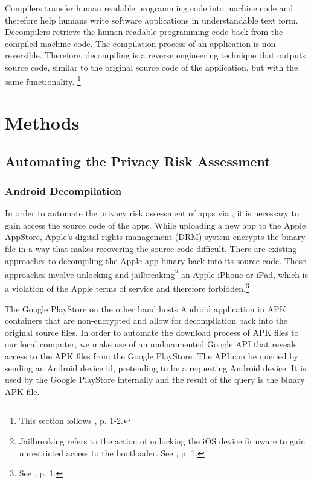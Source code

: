\documentclass[
	a4paper,
	oneside,
	12pt,
	liststotocnumbered
]{article}
\let\cite\textcite
\begin{document}
Compilers transfer human readable programming code into machine code and therefore help humans write software applications in understandable text form. 
Decompilers retrieve the human readable programming code back from the compiled machine code. 
The compilation process of an application is non-reversible. Therefore, decompiling is a reverse engineering technique that outputs source code, similar to the original source code of the application, but with the same functionality.  
\footnote{This section follows \cite{nolan2012decompiling}, p. 1-2.}

\section{Methods}

\subsection{Automating the Privacy Risk Assessment}

\subsubsection{Android Decompilation}

In order to automate the privacy risk assessment of \mH apps via \sca, it is necessary to gain access the source code of the apps. 
While uploading a new app to the Apple AppStore, Apple's digital rights management (\acs{DRM}) system encrypts the binary file in a way that makes recovering the source code difficult. 
There are existing approaches to decompiling the Apple app binary back into its source code.
These approaches involve unlocking and jailbreaking\footnote{Jailbreaking refers to the action of unlocking the iOS device firmware to gain unrestricted access to the bootloader. See \cite{Kweller2010}, p. 1.}
an Apple iPhone or iPad, which is a violation of the Apple terms of service and therefore forbidden.\footnote{See \cite{Kweller2010}, p. 1.}

The Google PlayStore on the other hand hosts Android application in \acs{APK} containers that are non-encrypted and allow for decompilation back into the original source files. 
In order to automate the download process of \acs{APK} files to our local computer, we make use of an undocumented Google \acs{API} that reveals access to the \acs{APK} files from the Google PlayStore. 
The \acs{API} can be queried by sending an Android device id, pretending to be a requesting Android device. It is used by the Google PlayStore internally and the result of the query is the binary \acs{APK} file.
\end{document}
